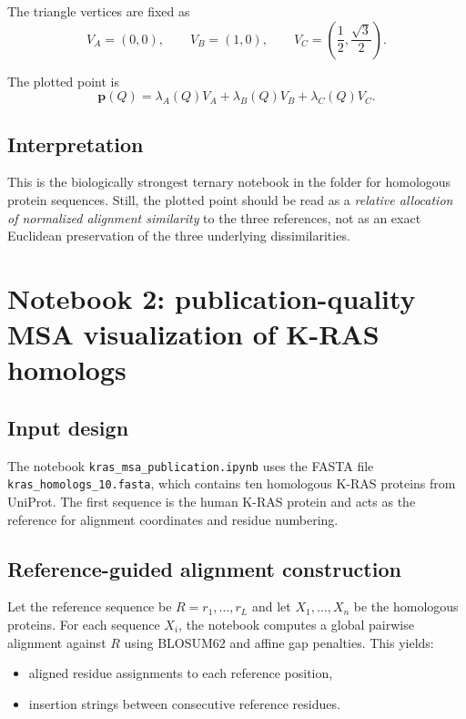 \documentclass[11pt,a4paper]{article}
\begin{document}
The triangle vertices are fixed as
\[
V_A=(0,0),\qquad
V_B=(1,0),\qquad
V_C=\left(\frac12,\frac{\sqrt3}{2}\right).
\]

The plotted point is
\[
\bm{p}(Q)=\lambda_A(Q)V_A+\lambda_B(Q)V_B+\lambda_C(Q)V_C.
\]

\subsection{Interpretation}

This is the biologically strongest ternary notebook in the folder for homologous protein sequences. Still, the plotted point should be read as a \emph{relative allocation of normalized alignment similarity} to the three references, not as an exact Euclidean preservation of the three underlying dissimilarities.

\section{Notebook 2: publication-quality MSA visualization of K-RAS homologs}

\subsection{Input design}

The notebook \texttt{kras\_msa\_publication.ipynb} uses the FASTA file \texttt{kras\_homologs\_10.fasta}, which contains ten homologous K-RAS proteins from UniProt. The first sequence is the human K-RAS protein and acts as the reference for alignment coordinates and residue numbering.

\subsection{Reference-guided alignment construction}

Let the reference sequence be $R=r_1,\dots,r_L$ and let $X_1,\dots,X_n$ be the homologous proteins. For each sequence $X_i$, the notebook computes a global pairwise alignment against $R$ using BLOSUM62 and affine gap penalties. This yields:

\begin{itemize}[leftmargin=*]
\item aligned residue assignments to each reference position,
\item insertion strings between consecutive reference residues.
\end{itemize}
\end{document}
